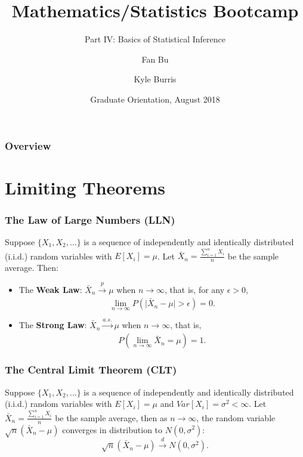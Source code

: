 \documentclass{beamer}
\title[Calculus]{Mathematics/Statistics Bootcamp} %
\subtitle{Part IV: Basics of Statistical Inference}
\author{Fan Bu\inst{1} \and Kyle Burris\inst{1}}
\institute[Duke University] %
{
  \inst{1}%
  Department of Statistical Science\\
  Duke University
  }
\date{Graduate Orientation, August 2018}
\begin{document}
\begin{frame}
\titlepage %
\end{frame}

\begin{frame}
\frametitle{Overview} %
\tableofcontents %
\end{frame}

\section{Limiting Theorems}
\begin{frame}
\frametitle{The Law of Large Numbers (LLN)}
Suppose $\{X_1,X_2,\ldots\}$ is a sequence of independently and identically distributed (i.i.d.) random variables with $E[X_i] = \mu$. Let $\bar{X}_n = \frac{\sum_{i=1}^n X_i}{n}$ be the sample average. Then:
\begin{itemize}
\item The \textbf{Weak Law}: $\bar{X}_n \xrightarrow[]{p} \mu$ when $n \rightarrow \infty$, that is, for any $\epsilon > 0$,
$$
\lim_{n \rightarrow \infty}P(\vert \bar{X}_n -\mu\vert > \epsilon) = 0.
$$
\item The \textbf{Strong Law}: $\bar{X}_n \xrightarrow[]{a.s.} \mu$ when $n \rightarrow \infty$, that is, 
$$
P\left( \lim_{n \rightarrow \infty}\bar{X}_n =\mu \right) = 1.
$$
\end{itemize}

\end{frame}

\begin{frame}
\frametitle{The Central Limit Theorem (CLT)}
Suppose $\{X_1,X_2,\ldots\}$ is a sequence of independently and identically distributed (i.i.d.) random variables with $E[X_i] = \mu$ and $Var[X_i] = \sigma^2 < \infty$. Let $\bar{X}_n = \frac{\sum_{i=1}^n X_i}{n}$ be the sample average, then as $n \rightarrow \infty$, the random variable $\sqrt{n} (\bar{X}_n - \mu)$ converges in distribution to $N(0,\sigma^2)$:
$$
\sqrt{n} (\bar{X}_n - \mu) \xrightarrow[]{d} N(0,\sigma^2).
$$
\end{frame}
\end{document}
